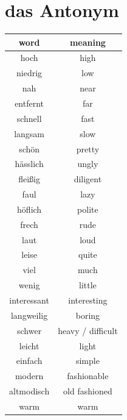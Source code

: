 \section{das Antonym}

\begin{center}
    \begin{tabular} {|c|c|}
        \hline
        \rowcolor{gray}
        word        & meaning           \\
        \hline
        hoch        & high              \\
        niedrig     & low               \\
        \hline
        nah         & near              \\
        entfernt    & far               \\
        \hline
        schnell     & fast              \\
        langsam     & slow              \\
        \hline
        schön       & pretty            \\
        hässlich    & ungly             \\
        \hline
        fleißig     & diligent          \\
        faul        & lazy              \\
        \hline
        höflich     & polite            \\
        frech       & rude              \\
        \hline
        laut        & loud              \\
        leise       & quite             \\
        \hline
        viel        & much              \\
        wenig       & little            \\
        \hline
        interessant & interesting       \\
        langweilig  & boring            \\
        \hline
        schwer      & heavy / difficult \\
        leicht      & light             \\
        einfach     & simple            \\
        \hline
        modern      & fashionable       \\
        altmodisch  & old fashioned     \\
        \hline
        warm        & warm              \\

\end{tabular}
\end{center}
